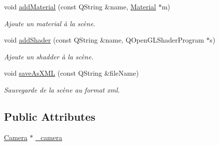 \begin{DoxyCompactItemize}
void \hyperlink{class_scene_a68761479fea650973d31e2d9565f8aca}{add\+Material} (const Q\+String \&name, \hyperlink{class_material}{Material} $\ast$m)
\begin{DoxyCompactList}\small\item\em Ajoute un material à la scène. \end{DoxyCompactList}\item 
void \hyperlink{class_scene_ad15253a331423b1e3c3fb2484b10509c}{add\+Shader} (const Q\+String \&name, Q\+Open\+G\+L\+Shader\+Program $\ast$s)
\begin{DoxyCompactList}\small\item\em Ajoute un shadder à la scène. \end{DoxyCompactList}\item 
void \hyperlink{class_scene_ae87e88cbefc16640354acc8ec11b5e1e}{save\+As\+X\+M\+L} (const Q\+String \&file\+Name)
\begin{DoxyCompactList}\small\item\em Sauvegarde de la scène au format xml. \end{DoxyCompactList}\end{DoxyCompactItemize}
\subsection*{Public Attributes}
\begin{DoxyCompactItemize}
\item 
\hyperlink{class_camera}{Camera} $\ast$ \hyperlink{class_scene_a8cce9e0f96edc8655a9b9a885e2c26bf}{\+\_\+camera}
\end{DoxyCompactItemize}
